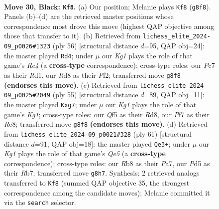 \documentclass[11pt]{article}
\begin{document}
\clearpage

\begin{figure}[p]\centering
\begin{subfigure}{0.46\textwidth}\centering
\resizebox{\linewidth}{!}{%
\newchessgame
\chessboard[
  setfen={1r1rn1k1/p1p2p2/8/2Pp1q1p/5P2/1P2P3/1Q1B2RP/4KBR1 b - - 0 30},
  showmover=false,
  pgfstyle=straightmove, color=movearrow, markmove={g8-f8}
]}
\caption{}
\end{subfigure}\hfill
\begin{subfigure}{0.46\textwidth}\centering
\resizebox{\linewidth}{!}{%
\newchessgame
\chessboard[
  setfen={r2r2k1/2p2ppp/2p1q3/3bP3/P3R2P/2Qp2N1/5PP1/3R2K1 w - - 2 29},
  showmover=false,
  pgfstyle=straightmove, color=movearrow, markmove={e4-d4}
]}
\caption{}
\end{subfigure}
\\[4pt]
\begin{subfigure}{0.46\textwidth}\centering
\resizebox{\linewidth}{!}{%
\newchessgame
\chessboard[
  setfen={3rr1k1/1pq2pB1/6p1/p2P2P1/5nQ1/1P6/P2R2BP/R5K1 b - - 0 28},
  showmover=false,
  pgfstyle=straightmove, color=movearrow, markmove={g8-g7}
]}
\caption{}
\end{subfigure}\hfill
\begin{subfigure}{0.46\textwidth}\centering
\resizebox{\linewidth}{!}{%
\newchessgame
\chessboard[
  setfen={2r3k1/pr1n2b1/5pp1/2p4p/4qP1P/P1B2B2/6P1/Q1R2RK1 b - - 1 31},
  showmover=false,
  pgfstyle=straightmove, color=movearrow, markmove={e4-e3}
]}
\caption{}
\end{subfigure}
\caption{\textbf{Move 30, Black: \texttt{Kf8}.} (a) Our position; Melanie plays \texttt{Kf8} (\texttt{g8f8}). Panels (b)--(d) are the retrieved master positions whose correspondence most drove this move (highest QAP objective among those that transfer to it). (b) Retrieved from \texttt{lichess\_elite\_2024-09\_p0026\#1323} (ply 56) [structural distance $d$=95, QAP obj=24]: the master played \texttt{Rd4}; under $\mu$ our \emph{Kg1} plays the role of that game's \emph{Re4} (a \textbf{cross-type} correspondence); cross-type roles: our \emph{P}c7 as their \emph{R}d1, our \emph{R}d8 as their \emph{P}f2; transferred move \texttt{g8f8} \textbf{(endorses this move)}. (c) Retrieved from \texttt{lichess\_elite\_2024-09\_p0025\#2049} (ply 55) [structural distance $d$=89, QAP obj=11]: the master played \texttt{Kxg7}; under $\mu$ our \emph{Kg1} plays the role of that game's \emph{Kg1}; cross-type roles: our \emph{Q}f5 as their \emph{R}d8, our \emph{P}f7 as their \emph{R}e8; transferred move \texttt{g8f8} \textbf{(endorses this move)}. (d) Retrieved from \texttt{lichess\_elite\_2024-09\_p0021\#328} (ply 61) [structural distance $d$=91, QAP obj=18]: the master played \texttt{Qe3+}; under $\mu$ our \emph{Kg1} plays the role of that game's \emph{Qe5} (a \textbf{cross-type} correspondence); cross-type roles: our \emph{R}b8 as their \emph{P}a7, our \emph{P}d5 as their \emph{R}b7; transferred move \texttt{g8h7}. Synthesis: 2 retrieved analogs transferred to \texttt{Kf8} (summed QAP objective 35, the strongest correspondence among the candidate moves); Melanie committed it via the \texttt{search} selector.}
\label{fig:thought-m59}
\end{figure}
\end{document}
